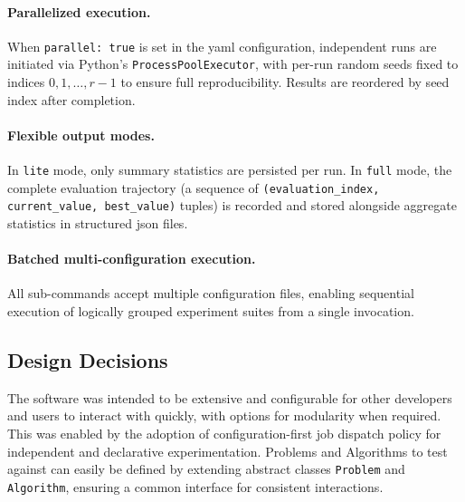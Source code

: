 \paragraph{Parallelized execution.}
When \texttt{parallel: true} is set in the \acrshort{yaml} configuration,
independent runs are initiated via
Python's \texttt{ProcessPoolExecutor}, with per-run random seeds fixed to
indices $0, 1, \ldots, r-1$ to ensure full reproducibility. Results are
reordered by seed index after completion.

\paragraph{Flexible output modes.}
In \texttt{lite} mode, only summary statistics are persisted per run. In
\texttt{full} mode, the complete evaluation trajectory (a sequence of
\texttt{(evaluation\_index, current\_value, best\_value)} tuples) is
recorded and stored alongside aggregate statistics in structured
\acrshort{json} files.

\paragraph{Batched multi-configuration execution.}
All sub-commands accept multiple configuration files, enabling sequential
execution of logically grouped experiment suites from a single invocation.

\subsection{Design Decisions}
The software was intended to be extensive and configurable for other
developers and users to interact with quickly, with options for
modularity when required.
This was enabled by the adoption of configuration-first job dispatch
policy for independent and declarative experimentation. Problems and
Algorithms to test against can easily be defined by extending
abstract classes \texttt{Problem} and \texttt{Algorithm}, ensuring a
common interface for consistent interactions.

